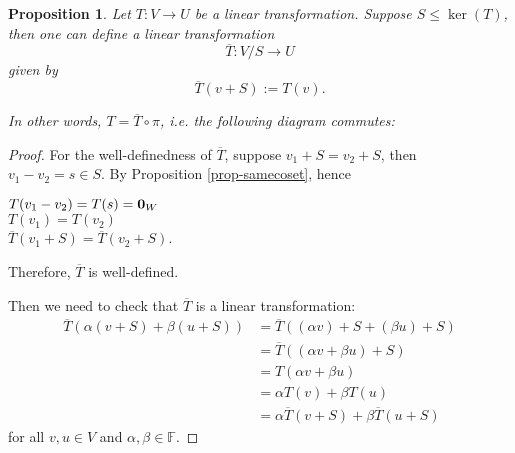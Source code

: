 \documentclass[11pt,openany]{book}
\theoremstyle{plain}
\newtheorem{proposition}[proposition]{Proposition}
\theoremstyle{definition}
\theoremstyle{remark}
\begin{document}
\begin{proposition} \label{prop-universalquot}
    Let $T: V \to U$ be a linear transformation. Suppose $S \leq \ker(T)$, then one can define a linear transformation
    $$\overline{T}: V/S \to U$$
    given by 
    $$\overline{T}(v+S) := T(v).$$ 

    In other words, $T = \overline{T} \circ \pi$, i.e. the following diagram commutes:
    \smallskip
\begin{center}
\end{center}
\end{proposition}
\begin{proof}
For the well-definedness of $\overline{T}$, suppose $v_1+S =v_2+S$, then $v_1-v_2 = s \in S$. By Proposition \ref{prop-samecoset}, hence
\begin{center}
    $T(v_1-v_2) = T(s) = {\bf 0}_{W}$ \\
    $T(v_1) = T(v_2)$ \\
    $\overline{T}(v_1+S) = \overline{T}(v_2+S)$.
\end{center}
Therefore, $\overline{T}$ is well-defined.

Then we need to check that $\overline{T}$ is a linear transformation:
\begin{align*}
    \overline{T}(\alpha(v+S)+\beta(u+S)) &= \overline{T}((\alpha v)+S+(\beta u)+S) \\
    &= \overline{T}((\alpha v+\beta u)+S) \\
    &= T(\alpha v+\beta u) \\
    &= \alpha T(v) + \beta T(u) \\
    &= \alpha \overline{T}(v+S) + \beta \overline{T}(u+S)
\end{align*}
for all $v, u \in V$ and $\alpha , \beta \in \mathbb{F}$.
\end{proof}
\end{document}
